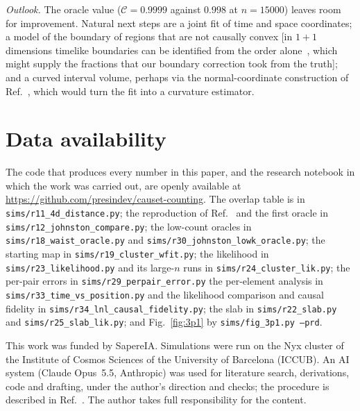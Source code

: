 \documentclass[prd,twocolumn,superscriptaddress,nofootinbib,amsmath,amssymb,floatfix]{revtex4-2}
\begin{document}
\emph{Outlook.} The oracle value ($\mathcal C=0.9999$ against $0.998$ at $n=15000$) leaves room for improvement. Natural next steps are a joint fit of time and space coordinates; a model of the boundary of regions that are not causally convex [in $1+1$ dimensions timelike boundaries can be identified from the order alone~\cite{Cunningham18}, which might supply the fractions that our boundary correction took from the truth]; and a curved interval volume, perhaps via the normal-coordinate construction of Ref.~\cite{Madsen26}, which would turn the fit into a curvature estimator.

\section*{Data availability}
The code that produces every number in this paper, and the research notebook in which the work was carried out, are openly available at \url{https://github.com/presindev/causet-counting}. The overlap table is in \texttt{sims/r11\_4d\_distance.py}; the reproduction of Ref.~\cite{Johnston25} and the first oracle in \texttt{sims/r12\_johnston\_compare.py}; the low-count oracles in \texttt{sims/r18\_waist\_oracle.py} and \texttt{sims/r30\_johnston\_lowk\_oracle.py}; the starting map in \texttt{sims/r19\_cluster\_wfit.py}; the likelihood in \texttt{sims/r23\_likelihood.py} and its large-$n$ runs in \texttt{sims/r24\_cluster\_lik.py}; the per-pair errors in \texttt{sims/r29\_perpair\_error.py} the per-element analysis in \texttt{sims/r33\_time\_vs\_position.py} and the likelihood comparison and causal fidelity in \texttt{sims/r34\_lnl\_causal\_fidelity.py}; the slab in \texttt{sims/r22\_slab.py} and \texttt{sims/r25\_slab\_lik.py}; and Fig.~\ref{fig:3p1} by \texttt{sims/fig\_3p1.py --prd}.

\begin{acknowledgments}
This work was funded by SapereIA. Simulations were run on the Nyx cluster of the Institute of Cosmos Sciences of the University of Barcelona (ICCUB). An AI system (Claude Opus~5.5, Anthropic) was used for literature search, derivations, code and drafting, under the author's direction and checks; the procedure is described in Ref.~\cite{MethodNote}. The author takes full responsibility for the content.
\end{acknowledgments}

\appendix
\end{document}

